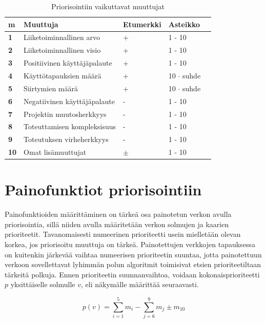   \begin{table}[H]
    \caption{Priorisointiin vaikuttavat muuttujat}
    \label{tab:priorisointiin_vaikuttavat_muuttujat}
    \centering
    \begin{tabular}{lllll} \hline
    \textbf{m} & \textbf{Muuttuja} & \textbf{Etumerkki} & \textbf{Asteikko} &  \\ \hline
    \textbf{1} & Liiketoiminnallinen arvo & + & 1 - 10 &  \\
    \textbf{2} & Liiketoiminnallinen visio & + & 1 - 10 &  \\
    \textbf{3} & Positiivinen käyttäjäpalaute & + & 1 - 10 &  \\
    \textbf{4} & Käyttötapauksien määrä & + & 10 \(\cdot\) suhde &  \\
    \textbf{5} & Siirtymien määrä & + & 10 \(\cdot\) suhde &  \\
    \textbf{6} & Negatiivinen käyttäjäpalaute & - & 1 - 10 &  \\
    \textbf{7} & Projektin muutosherkkyys & - & 1 - 10 &  \\
    \textbf{8} & Toteuttamisen kompleksisuus & - & 1 - 10 &  \\
    \textbf{9} & Toteutuksen virheherkkyys & - & 1 - 10 &  \\
    \textbf{10} & Omat lisämuuttujat & \(\pm\) & 1 - 10 &  \\ \hline
    \end{tabular}
  \end{table}

\section{Painofunktiot priorisointiin} \label{ch:10_painofunktiot_priorisointiin}

  Painofunktioiden määrittäminen on tärkeä osa painotetun verkon avulla priorisointia, sillä niiden avulla määritetään verkon solmujen ja kaarien prioriteetit.
  Tavanomaisesti numeerinen prioriteetti usein mielletään olevan korkea, jos priorisoitu muuttuja on tärkeä.
  Painotettujen verkkojen tapauksessa on kuitenkin järkevää vaihtaa numeerisen prioriteetin suuntaa, jotta painotettuun verkoon sovellettavat lyhimmän polun algoritmit toimisivat etsien prioriteetiltaan tärkeitä polkuja. Ennen prioriteetin suunnanvaihtoa, voidaan kokonaisprioriteetti \(p\) yksittäiselle solmulle \(v\), eli näkymälle määrittää seuraavasti.

  \[p(v) = \sum_{i=1}^{5} m_i - \sum_{j=6}^{9} m_j \pm m_{10}\]

